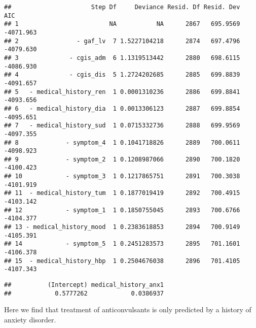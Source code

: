 \documentclass[
]{article}
\newenvironment{Shaded}{\begin{snugshade}}{\end{snugshade}}
\newcommand{\CommentTok}[1]{\textcolor[rgb]{0.56,0.35,0.01}{\textit{#1}}}
\newcommand{\NormalTok}[1]{#1}
\newcommand{\SpecialCharTok}[1]{\textcolor[rgb]{0.81,0.36,0.00}{\textbf{#1}}}
\begin{document}
\begin{verbatim}
##                      Step Df     Deviance Resid. Df Resid. Dev       AIC
## 1                         NA           NA      2867   695.9569 -4071.963
## 2                - gaf_lv  7 1.5227104218      2874   697.4796 -4079.630
## 3              - cgis_adm  6 1.1319513442      2880   698.6115 -4086.930
## 4              - cgis_dis  5 1.2724202685      2885   699.8839 -4091.657
## 5   - medical_history_ren  1 0.0001310236      2886   699.8841 -4093.656
## 6   - medical_history_dia  1 0.0013306123      2887   699.8854 -4095.651
## 7   - medical_history_sud  1 0.0715332736      2888   699.9569 -4097.355
## 8             - symptom_4  1 0.1041718826      2889   700.0611 -4098.923
## 9             - symptom_2  1 0.1208987066      2890   700.1820 -4100.423
## 10            - symptom_3  1 0.1217865751      2891   700.3038 -4101.919
## 11  - medical_history_tum  1 0.1877019419      2892   700.4915 -4103.142
## 12            - symptom_1  1 0.1850755045      2893   700.6766 -4104.377
## 13 - medical_history_mood  1 0.2383618853      2894   700.9149 -4105.391
## 14            - symptom_5  1 0.2451283573      2895   701.1601 -4106.378
## 15  - medical_history_hbp  1 0.2504676038      2896   701.4105 -4107.343
\end{verbatim}

\begin{Shaded}
\end{Shaded}

\begin{verbatim}
##          (Intercept) medical_history_anx1 
##            0.5777262            0.0386937
\end{verbatim}

Here we find that treatment of anticonvulsants is only predicted by a
history of anxiety disorder.
\end{document}
